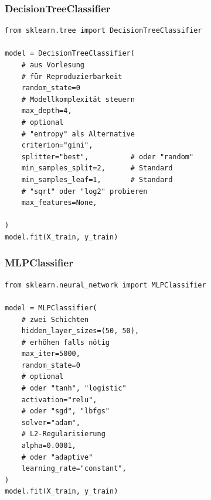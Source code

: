 \subsubsection{DecisionTreeClassifier}
\begin{propertylist}[Faustregeln]
\end{propertylist}
\begin{codebox}
\begin{lstlisting}[style=CodeExpert]
from sklearn.tree import DecisionTreeClassifier

model = DecisionTreeClassifier(
    # aus Vorlesung
    # für Reproduzierbarkeit
    random_state=0
    # Modellkomplexität steuern
    max_depth=4,
    # optional
    # "entropy" als Alternative
    criterion="gini",
    splitter="best",          # oder "random"
    min_samples_split=2,      # Standard
    min_samples_leaf=1,       # Standard
    # "sqrt" oder "log2" probieren
    max_features=None,

)
model.fit(X_train, y_train)
\end{lstlisting}
\end{codebox}


\subsubsection{MLPClassifier}
\begin{propertylist}[Faustregeln]
\end{propertylist}

\begin{codebox}
\begin{lstlisting}[style=CodeExpert]
from sklearn.neural_network import MLPClassifier

model = MLPClassifier(
    # zwei Schichten
    hidden_layer_sizes=(50, 50),
    # erhöhen falls nötig
    max_iter=5000,
    random_state=0
    # optional
    # oder "tanh", "logistic"
    activation="relu",
    # oder "sgd", "lbfgs"
    solver="adam",
    # L2-Regularisierung
    alpha=0.0001,
    # oder "adaptive"
    learning_rate="constant",
)
model.fit(X_train, y_train)
\end{lstlisting}
\end{codebox}

